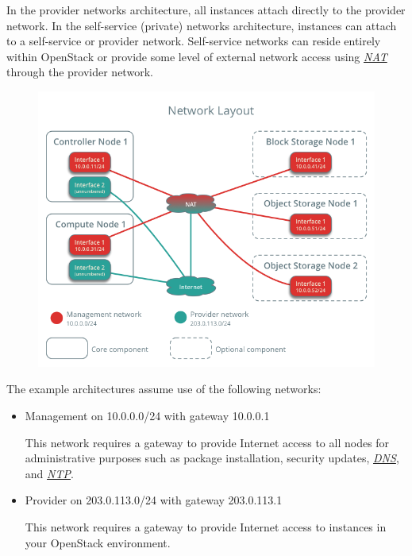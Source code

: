 \documentclass[letterpaper,10pt,english]{sphinxmanual}
\begin{document}
In the provider networks architecture, all instances attach directly
to the provider network. In the self-service (private) networks architecture,
instances can attach to a self-service or provider network. Self-service
networks can reside entirely within OpenStack or provide some level of external
network access using {\hyperref[_source/glossary:term-nat]{\emph{NAT}}} through the provider network.
\begin{figure}[htbp]
\centering

\includegraphics{networklayout.png}
\label{_source/installation_guide/environment-networking:figure-networklayout}\end{figure}

The example architectures assume use of the following networks:
\begin{itemize}
\item {} 
Management on 10.0.0.0/24 with gateway 10.0.0.1

This network requires a gateway to provide Internet access to all
nodes for administrative purposes such as package installation,
security updates, {\hyperref[_source/glossary:term-dns]{\emph{DNS}}}, and {\hyperref[_source/glossary:term-ntp]{\emph{NTP}}}.

\item {} 
Provider on 203.0.113.0/24 with gateway 203.0.113.1

This network requires a gateway to provide Internet access to
instances in your OpenStack environment.

\end{itemize}
\end{document}

